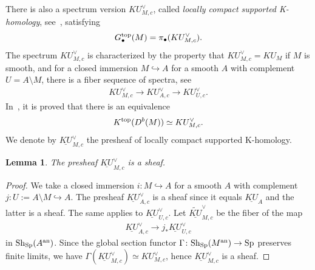 \documentclass [11pt,oneside,a4paper,mathscr]{amsart}
\newtheorem{lemma}[thm]{Lemma}
\theoremstyle{definition}
\begin{document}
There is also a spectrum 
version $KU_{M, c}^{\vee}$, 
called \textit{locally compact supported K-homology}, see~\cite[Lemma~2.6]{HLP}, 
satisfying 
\begin{align*}
G_{\bullet}^{\rm{top}}(M)=
    \pi_{\bullet}(KU_{M, c}^{\vee}).
\end{align*}
The spectrum $KU_{M, c}^{\vee}$ is 
characterized by the property that $KU_{M, c}^{\vee}=KU_M$ if $M$ is smooth, 
and for a closed immersion $M\hookrightarrow A$ for a smooth $A$ 
with complement $U=A\setminus M$,
there is a fiber sequence of spectra, see~\cite[Lemma~2.6]{HLP}
\begin{align}\label{fib:Kdual}
    KU_{M, c}^{\vee} \to KU_{A, c}^{\vee} \to KU_{U, c}^{\vee}.
\end{align}
In~\cite[Theorem~2.10]{HLP}, it is proved 
that there is an equivalence 
\begin{align}\label{equiv:csupp}
	K^{\rm{top}}(D^b(M)) \simeq KU_{M, c}^{\vee}. 
\end{align}
We denote by $\underline{KU}_{M, c}^{\vee}$ the presheaf of locally 
compact supported K-homology.  
\begin{lemma}\label{lem:sheaf}
The presheaf $\underline{KU}_{M, c}^{\vee}$ is a sheaf. 
\end{lemma}
\begin{proof}
We take a closed immersion $i\colon M\hookrightarrow A$ for a smooth $A$
with complement $j\colon U:=A\setminus M \hookrightarrow A$.
The presheaf $\underline{KU}_{A, c}^{\vee}$ is a sheaf since it equals
$\underline{KU}_A$ and the latter is a sheaf. The same applies to $\underline{KU}_{U, c}^{\vee}$. 
Let $\widetilde{\underline{KU}}_{M, c}^{\vee}$ be the fiber of the map 
\begin{align*}
    \underline{KU}_{A, c}^{\vee} \to j_{*}\underline{KU}_{U, c}^{\vee}
\end{align*}
in $\mathrm{Sh}_{\mathrm{Sp}}(A^{\rm{an}})$. Since the global section functor 
$\Gamma \colon \mathrm{Sh}_{\mathrm{Sp}}(M^{\rm{an}}) \to \mathrm{Sp}$ preserves finite limits, 
we have $\Gamma(\underline{KU}_{M, c}^{\vee})\simeq KU_{M, c}^{\vee}$, hence 
$\underline{KU}_{M, c}^{\vee}$ is a sheaf. 
\end{proof}
\end{document}
